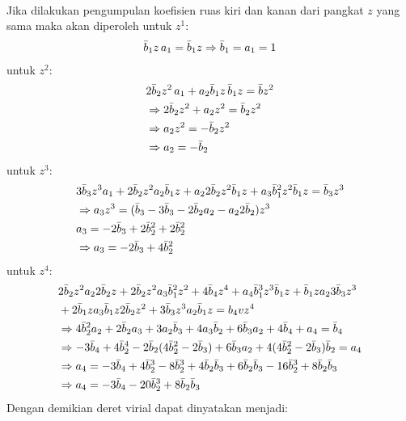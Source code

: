\documentclass[a4paper , 12pt, cc]{article}
\begin{document}
\begin{enumerate}
\begin{enumerate}
\begin{align}
\end{align}
Jika dilakukan pengumpulan koefisien ruas kiri dan kanan dari pangkat $z$ yang sama maka akan diperoleh \newline 
untuk $z^1$:
\begin{align}
\bar{b}_1 z \, a_1  = \bar{b}_1 z \Rightarrow \bar{b}_1 = a_1 = 1 
\end{align}
untuk $z^2$: 
\begin{align}
& 2 \bar{b}_2 z^2 \, a_1 + a_2 \bar{b}_1 z \, \bar{b}_1 z  = \bar{b} z^2 \nonumber \\
& \Rightarrow 2 \bar{b}_2 z^2 + a_2 z^2 = \bar{b}_2 z^2 \nonumber \\
& \Rightarrow a_2 z^2  = - \bar{b}_2 z^2  \nonumber \\
& \Rightarrow a_2 = - \bar{b}_2 
\end{align}
untuk $z^3$:
\begin{align}
& 3 \bar{b}_3 z^3 a_1 + 2 \bar{b}_2 z^2 a_2 \bar{b}_1 z + a_2 2 \bar{b}_2 z^2 \bar{b}_1 z + a_3 \bar{b}_1^2 z^2 \bar{b}_1 z = \bar{b}_3 z^3  \nonumber \\
& \Rightarrow a_3 z^3 = (\bar{b}_3 - 3 \bar{b}_3 - 2 \bar{b}_2 a_2 - a_2 2 \bar{b}_2)z^3  \nonumber \\
& a_3 = - 2 \bar{b}_3 + 2 \bar{b}_2^2 + 2 \bar{b}_2^2 \nonumber \\
& \Rightarrow a_3 = - 2 \bar{b}_3 + 4 \bar{b}_2^2
\end{align}
untuk $z^4$:
\begin{align}
& 2 \bar{b}_2 z^2 a_2 2 \bar{b}_2 z + 2 \bar{b}_2 z^2 a_3 \bar{b}_1^2 z^2 + 4 \bar{b}_4 z^4 + a_4 \bar{b}_1^3 z^3 \bar{b}_1 z  + \bar{b}_1 z a_2 3 \bar{b}_3 z^3 \nonumber \\
& + 2 \bar{b}_1 z  a_3 \bar{b}_1 z 2 \bar{b}_2 z^2  + 3 \bar{b}_3 z^3 a_2 \bar{b}_1 z  = b_4v z^4 \nonumber \\
&\Rightarrow 4 \bar{b}_2^2 a_2 + 2 \bar{b}_2 a_3 + 3 a_2 \bar{b}_3 + 4 a_3 \bar{b}_2 + 6 \bar{b}_3 a_2 + 4 \bar{b}_4 + a_4 = \bar{b}_4 \nonumber \\
& \Rightarrow - 3\bar{b}_4 + 4\bar{b}_2^4  - 2 \bar{b}_2 (4 \bar{b}_2^2 - 2 \bar{b}_3) + 6 \bar{b}_3 a_2 + 4(4 \bar{b}_2^2 - 2 \bar{b}_3)\bar{b}_2  = a_4\nonumber \\
& \Rightarrow a_4 = -3 \bar{b}_4 + 4 \bar{b}_2^3 - 8 \bar{b}_2^3 + 4 \bar{b}_2 \bar{b}_3 + 6 \bar{b}_2 \bar{b}_3 - 16 \bar{b}_2^3 + 8 \bar{b}_2 \bar{b}_3 \nonumber \\
& \Rightarrow a_4 = - 3\bar{b}_4 - 20 \bar{b}_2^3 + 8\bar{b}_2 \bar{b}_3
\end{align}
Dengan demikian deret virial dapat dinyatakan menjadi:
\begin{align}

\end{align}
\end{enumerate}
\end{enumerate}
\end{document}
